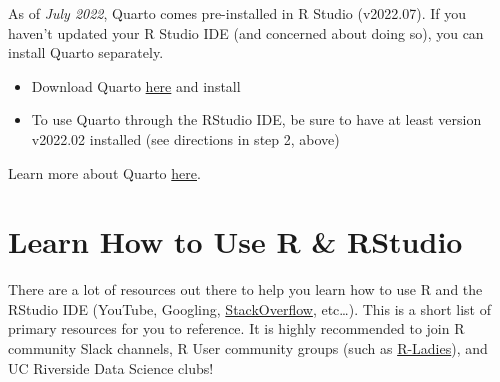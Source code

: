 \documentclass[
]{book}
\begin{document}
As of \emph{July 2022}, Quarto comes pre-installed in R Studio (v2022.07). If you haven't updated your R Studio IDE (and concerned about doing so), you can install Quarto separately.

\begin{itemize}
\item
  Download Quarto \href{https://quarto.org/docs/get-started/}{here} and install
\item
  To use Quarto through the RStudio IDE, be sure to have at least version v2022.02 installed (see directions in step 2, above)
\end{itemize}

Learn more about Quarto \href{https://quarto.org/docs/get-started/hello/rstudio.html}{here}.

\hypertarget{learn-how-to-use-r-rstudio}{%
\section{Learn How to Use R \& RStudio}\label{learn-how-to-use-r-rstudio}}

There are a lot of resources out there to help you learn how to use R and the RStudio IDE (YouTube, Googling, \href{https://stackoverflow.com/}{StackOverflow}, etc\ldots). This is a short list of primary resources for you to reference. It is highly recommended to join R community Slack channels, R User community groups (such as \href{https://rladies.org/}{R-Ladies}), and UC Riverside Data Science clubs!
\end{document}
